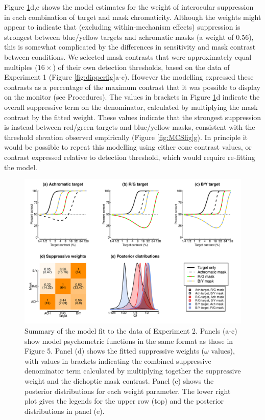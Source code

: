 \documentclass[
]{article}
\begin{document}
Figure \ref{fig:MCSmodel}d,e shows the model estimates for the weight of interocular suppression in each combination of target and mask chromaticity. Although the weights might appear to indicate that (excluding within-mechanism effects) suppression is strongest between blue/yellow targets and achromatic masks (a weight of 0.56), this is somewhat complicated by the differences in sensitivity and mask contrast between conditions. We selected mask contrasts that were approximately equal multiples (\(16\times\)) of their own detection thresholds, based on the data of Experiment 1 (Figure \ref{fig:dipperfig}a-c). However the modelling expressed these contrasts as a percentage of the maximum contrast that it was possible to display on the monitor (see Procedures). The values in brackets in Figure \ref{fig:MCSmodel}d indicate the overall suppressive term on the denominator, calculated by multiplying the mask contrast by the fitted weight. These values indicate that the strongest suppression is instead between red/green targets and blue/yellow masks, consistent with the threshold elevation observed empirically (Figure \ref{fig:MCSfig}g). In principle it would be possible to repeat this modelling using either cone contrast values, or contrast expressed relative to detection threshold, which would require re-fitting the model.

\begin{figure}

{\centering \includegraphics{Figures/MCSmodel} 

}

\caption{Summary of the model fit to the data of Experiment 2. Panels (a-c) show model psychometric functions in the same format as those in Figure 5. Panel (d) shows the fitted suppressive weights ($\omega$ values), with values in brackets indicating the combined suppressive denominator term calculated by multiplying together the suppressive weight and the dichoptic mask contrast. Panel (e) shows the posterior distributions for each weight parameter. The lower right plot gives the legends for the upper row (top) and the posterior distributions in panel (e).}\label{fig:MCSmodel}
\end{figure}
\end{document}
